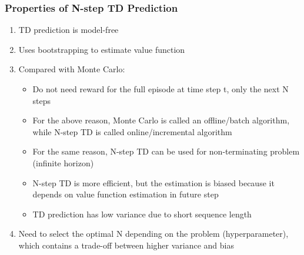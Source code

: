 \documentclass[11pt]{article}
\begin{document}
\subsubsection{Properties of N-step TD Prediction}
\begin{enumerate}
    \item TD prediction is model-free
    \item Uses bootstrapping to estimate value function
    \item Compared with Monte Carlo:
    \begin{itemize}
        \item Do not need reward for the full episode at time step t, only the next N steps
        \item For the above reason, Monte Carlo is called an offline/batch algorithm, while N-step TD is called online/incremental algorithm
        \item For the same reason, N-step TD can be used for non-terminating problem (infinite horizon)
        \item N-step TD is more efficient, but the estimation is biased because it depends on value function estimation in future step
        \item TD prediction has low variance due to short sequence length
    \end{itemize}
    \item Need to select the optimal N depending on the problem (hyperparameter), which contains a trade-off between higher variance and bias 
\end{enumerate}

{


}
\end{document}
